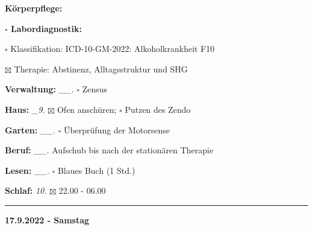 \documentclass[10pt,a4paper]{article}
\newcommand\prop[1] {{\color {alizarin} {\bf #1}}}             %
\newcommand\rele[1] {{\color {english} \bf {#1}}}              %
\newcommand\mand[1] {{\color {burntorange} {\bf #1}}}          %
\newcommand\ddivide {\vskip -9pt \hrule \vskip 6pt}
\newcommand\bottomspace{\vskip 4pt}
\newcommand\n[1] { {\sl #1.} \hskip 5pt }
\begin{document}
\begin{mdframed}[style=daystyle]
\begin{labeling}{{\mand {Körperpflege:}}}
\begin{minipage}{0.75\textwidth}
\begin{labeling}{{\prop {$\square$ Labordiagnostik:}}}
      \item[$\square$ Klassifikation:]    ICD-10-GM-2022: Alkoholkrankheit F10
      \item[$\boxtimes$ Therapie:]        Abstinenz, Alltagsstruktur und SHG
      \end{labeling}
    \end{minipage}
    \bottomspace
  \item[{\mand {Verwaltung:}}]   \n{\_\_} $\square$ Zensus
  \item[{\mand {Haus:}}]          \n{\_9} $\boxtimes$ Ofen anschüren; $\square$ Putzen des Zendo
  \item[{\mand {Garten:}}]       \n{\_\_} $\square$ Überprüfung der Motorsense
  \item[{\mand {Beruf:}}]        \n{\_\_} Aufschub bis nach der stationären Therapie
  \item[{\mand {Lesen:}}]        \n{\_\_} $\square$ Blaues Buch (1 Std.)
  \item[{\mand {Schlaf:}}]         \n{10} $\boxtimes$ 22.00 - 06.00
  \end{labeling}
\end{mdframed}


\ddivide
{\rele {17.9.2022 - Samstag}}
\end{document}
